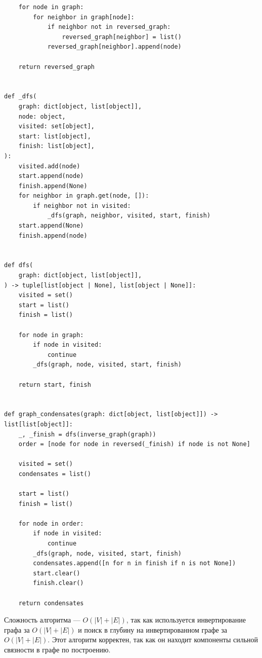 \documentclass{article}
\begin{document}
\begin{enumerate}
\begin{enumerate}
\begin{lstlisting}
	for node in graph:
		for neighbor in graph[node]:
			if neighbor not in reversed_graph:
				reversed_graph[neighbor] = list()
			reversed_graph[neighbor].append(node)

	return reversed_graph


def _dfs(
	graph: dict[object, list[object]],
	node: object,
	visited: set[object],
	start: list[object],
	finish: list[object],
):
	visited.add(node)
	start.append(node)
	finish.append(None)
	for neighbor in graph.get(node, []):
		if neighbor not in visited:
			_dfs(graph, neighbor, visited, start, finish)
	start.append(None)
	finish.append(node)


def dfs(
	graph: dict[object, list[object]],
) -> tuple[list[object | None], list[object | None]]:
	visited = set()
	start = list()
	finish = list()

	for node in graph:
		if node in visited:
			continue
		_dfs(graph, node, visited, start, finish)

	return start, finish


def graph_condensates(graph: dict[object, list[object]]) -> list[list[object]]:
	_, _finish = dfs(inverse_graph(graph))
	order = [node for node in reversed(_finish) if node is not None]

	visited = set()
	condensates = list()

	start = list()
	finish = list()

	for node in order:
		if node in visited:
			continue
		_dfs(graph, node, visited, start, finish)
		condensates.append([n for n in finish if n is not None])
		start.clear()
		finish.clear()

	return condensates		
	\end{lstlisting}

		            Сложность алгоритма ---
		            $O(\left| V \right| + \left| E \right|)$,
		            так как используется инвертирование графа за
		            $O(\left| V \right| + \left| E \right|)$ и
		            поиск в глубину на инвертированном графе за
		            $O(\left| V \right| + \left| E \right|)$.
		            Этот алгоритм корректен, так как он находит
		            компоненты сильной связности в графе по построению.


\end{enumerate}
\end{enumerate}
\end{document}
